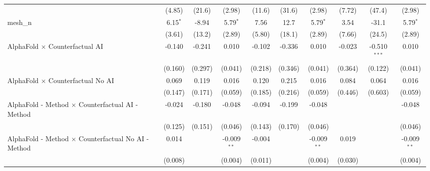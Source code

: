 \begin{tabular}{lccccccccc}
                                                               & (4.85)        & (21.6)        & (2.98)        & (11.6)       & (31.6)       & (2.98)        & (7.72)         & (47.4)         & (2.98)\\   
   mesh\_n                                                     & 6.15$^{*}$    & -8.94         & 5.79$^{*}$    & 7.56         & 12.7         & 5.79$^{*}$    & 3.54           & -31.1          & 5.79$^{*}$\\   
                                                               & (3.61)        & (13.2)        & (2.89)        & (5.80)       & (18.1)       & (2.89)        & (7.66)         & (24.5)         & (2.89)\\   
   AlphaFold $\times$ Counterfactual AI                        & -0.140        & -0.241        & 0.010         & -0.102       & -0.336       & 0.010         & -0.023         & -0.510$^{***}$ & 0.010\\   
                                                               & (0.160)       & (0.297)       & (0.041)       & (0.218)      & (0.346)      & (0.041)       & (0.364)        & (0.122)        & (0.041)\\   
   AlphaFold $\times$ Counterfactual No AI                     & 0.069         & 0.119         & 0.016         & 0.120        & 0.215        & 0.016         & 0.084          & 0.064          & 0.016\\   
                                                               & (0.147)       & (0.171)       & (0.059)       & (0.185)      & (0.216)      & (0.059)       & (0.446)        & (0.603)        & (0.059)\\   
   AlphaFold - Method $\times$ Counterfactual AI - Method      & -0.024        & -0.180        & -0.048        & -0.094       & -0.199       & -0.048        &                &                & -0.048\\   
                                                               & (0.125)       & (0.151)       & (0.046)       & (0.143)      & (0.170)      & (0.046)       &                &                & (0.046)\\   
   AlphaFold - Method $\times$ Counterfactual No AI - Method   & 0.014         &               & -0.009$^{**}$ & -0.004       &              & -0.009$^{**}$ & 0.019          &                & -0.009$^{**}$\\   
                                                               & (0.008)       &               & (0.004)       & (0.011)      &              & (0.004)       & (0.030)        &                & (0.004)\\   

\end{tabular}
